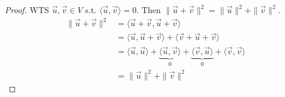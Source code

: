 \documentclass[11pt,fleqn]{book} %
\begin{document}
\begin{proof}
    WTS $\overrightarrow{u}, \overrightarrow{v} \in V$ s.t. $\langle \overrightarrow{u}, \overrightarrow{v} \rangle = 0$. Then $\|\overrightarrow{u} + \overrightarrow{v}\|^2 = \|\overrightarrow{u}\|^2 + \|\overrightarrow{v}\|^2$. 
    \begin{align*}
        \|\overrightarrow{u} + \overrightarrow{v}\|^2
        &= \langle \overrightarrow{u} + \overrightarrow{v}, \overrightarrow{u} + \overrightarrow{v} \rangle
        \\
        &= \langle \overrightarrow{u}, \overrightarrow{u} + \overrightarrow{v} \rangle + \langle \overrightarrow{v} + \overrightarrow{u} + \overrightarrow{v} \rangle
        \\
        &=
        \langle \overrightarrow{u}, \overrightarrow{u} \rangle + \underbrace{\langle \overrightarrow{u}, \overrightarrow{v} \rangle}_{0} + \underbrace{\langle \overrightarrow{v}, \overrightarrow{u} \rangle}_{0} + \langle \overrightarrow{v}, \overrightarrow{v} \rangle
        \\
        &= \|\overrightarrow{u}\|^2 + \|\overrightarrow{v}\|^2
    \end{align*}
\end{proof}
\end{document}

